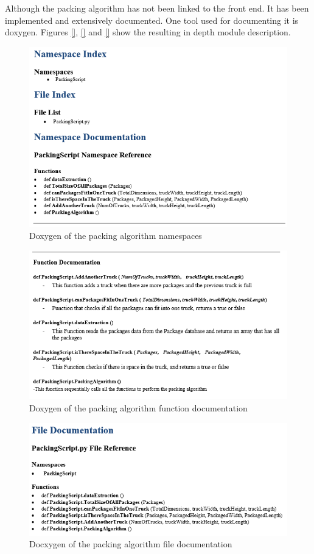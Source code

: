 \documentclass[paper=a4, fontsize=11pt]{scrartcl} %
\numberwithin{equation}{section} %
\numberwithin{figure}{section} %
\numberwithin{table}{section} %
\begin{document}
Although the packing algorithm has not been linked to the front end. It has been implemented and extensively documented. One tool used for documenting it is doxygen. Figures \ref{}, \ref{} and \ref{} show the resulting in depth module description.

\begin{figure}[hbt!]
\centering
\includegraphics[width=4.5in]{pictures/doxygen/first_dox_pack.png}
\caption{Doxygen of the packing algorithm namespaces}
\label{DoxyOnePack}
\end{figure}

\begin{figure}[hbt!]
\centering
\includegraphics[width=4.5in]{pictures/doxygen/second_dox_pack.png}
\caption{Doxygen of the packing algorithm function documentation}
\label{DoxyTwoPack}
\end{figure}

\begin{figure}[hbt!]
\centering
\includegraphics[width=4.5in]{pictures/doxygen/third_dox_pack.png}
\caption{Docxygen of the packing algorithm file documentation}
\label{DoxyThreePack}
\end{figure}
\end{document}
